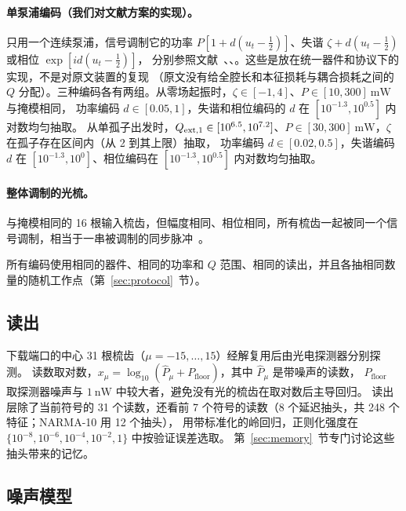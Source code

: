 \paragraph{单泵浦编码（我们对文献方案的实现）。}
只用一个连续泵浦，信号调制它的功率 $P[1+d(u_t-\tfrac12)]$、失谐 $\zeta+d(u_t-\tfrac12)$ 或相位 $\exp[i d(u_t-\tfrac12)]$，
分别参照文献~\cite{shishavan2025}、\cite{cuevas2025}、\cite{arabieh2026soliton}。这些是放在统一器件和协议下的实现，不是对原文装置的复现
（原文没有给全腔长和本征损耗与耦合损耗之间的 $Q$ 分配）。三种编码各有两组。从零场起振时，$\zeta\in[-1,4]$、$P\in[10,300]~\mathrm{mW}$ 与掩模相同，
功率编码 $d\in[0.05,1]$，失谐和相位编码的 $d$ 在 $[10^{-1.3},10^{0.5}]$ 内对数均匀抽取。
从单孤子出发时，$Q_{\mathrm{ext},1}\in[10^{6.5},10^{7.2}]$、$P\in[30,300]~\mathrm{mW}$，$\zeta$ 在孤子存在区间内（从 2 到其上限）抽取，
功率编码 $d\in[0.02,0.5]$，失谐编码 $d$ 在 $[10^{-1.3},10^{0}]$、相位编码在 $[10^{-1.3},10^{0.5}]$ 内对数均匀抽取。

\paragraph{整体调制的光梳。}
与掩模相同的 16 根输入梳齿，但幅度相同、相位相同，所有梳齿一起被同一个信号调制，相当于一串被调制的同步脉冲~\cite{arabieh2026pulse}。

所有编码使用相同的器件、相同的功率和 $Q$ 范围、相同的读出，并且各抽相同数量的随机工作点（第~\ref{sec:protocol}~节）。

\subsection{读出}\label{sec:readout-def}

下载端口的中心 31 根梳齿（$\mu=-15,\dots,15$）经解复用后由光电探测器分别探测。
读数取对数，$x_\mu=\log_{10}(\hat P_\mu+P_\mathrm{floor})$，其中 $\hat P_\mu$ 是带噪声的读数，
$P_\mathrm{floor}$ 取探测器噪声与 $1~\mathrm{nW}$ 中较大者，避免没有光的梳齿在取对数后主导回归。
读出层除了当前符号的 31 个读数，还看前 7 个符号的读数（8 个延迟抽头，共 248 个特征；NARMA-10 用 12 个抽头），
用带标准化的岭回归，正则化强度在 $\{10^{-8},10^{-6},10^{-4},10^{-2},1\}$ 中按验证误差选取。
第~\ref{sec:memory}~节专门讨论这些抽头带来的记忆。

\subsection{噪声模型}\label{sec:noise-model}

